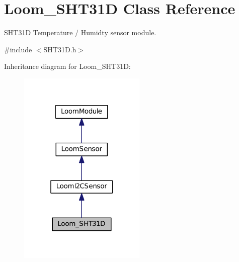 \hypertarget{class_loom___s_h_t31_d}{}\section{Loom\+\_\+\+S\+H\+T31D Class Reference}
\label{class_loom___s_h_t31_d}


S\+H\+T31D Temperature / Humidty sensor module.  




{\ttfamily \#include $<$S\+H\+T31\+D.\+h$>$}



Inheritance diagram for Loom\+\_\+\+S\+H\+T31D\+:\nopagebreak
\begin{figure}[H]
\begin{center}
\leavevmode
\includegraphics[width=172pt]{class_loom___s_h_t31_d__inherit__graph}
\end{center}
\end{figure}
